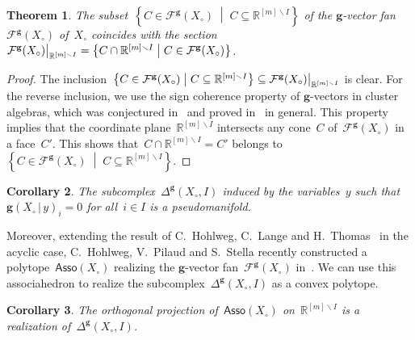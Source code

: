 \documentclass{amsart}
\newtheorem{theorem}{Theorem}%
\newtheorem{corollary}[theorem]{Corollary}
\theoremstyle{definition}
\newcommand{\R}{\mathbb{R}} %
\renewcommand{\b}[1]{\mathbf{#1}} %
\newcommand{\set}[2]{\left\{ #1 \;\middle|\; #2 \right\}} %
\newcommand{\ssm}{\smallsetminus} %
\newcommand{\Asso}{\mathsf{Asso}} %
\newcommand{\gvector}[2]{\mathbf{g}(#1 \,|\, #2)} %
\newcommand{\gvectorFan}{\mathcal{F}^\mathbf{g}} %
\newcommand{\restrictedComplex}[3]{\Delta^{\b{#1}}(#2,#3)} %
\renewcommand{\restriction}[2]{\left.\kern-\nulldelimiterspace #1 \vphantom{\big|} \right|_{#2}}
\begin{document}
\begin{theorem}
The subset~$\set{C \in \gvectorFan(X_\circ)}{C \subseteq \R^{[m] \ssm I}}$ of the $\b{g}$-vector fan~$\gvectorFan(X_\circ)$ of~$X_\circ$ coincides with the section~$\restriction{\gvectorFan(X_\circ)}{\R^{[m] \ssm I}} = \set{C \cap \R^{[m] \ssm I}}{C \in \gvectorFan(X_\circ)}$.
\end{theorem}

\begin{proof}
The inclusion~$\set{C \in \gvectorFan(X_\circ)}{C \subseteq \R^{[m] \ssm I}} \subseteq \restriction{\gvectorFan(X_\circ)}{\R^{[m] \ssm I}}$ is clear. For the reverse inclusion, we use the sign coherence property of $\b{g}$-vectors in cluster algebras, which was conjectured in~\cite[Conjecture 6.13]{FominZelevinsky-ClusterAlgebrasIV} and proved in~\cite[Theorem 5.1]{GrossHackingKeelKontsevich} in general. This property implies that the coordinate plane~$\R^{[m] \ssm I}$ intersects any cone~$C$ of~$\gvectorFan(X_\circ)$ in a face~$C'$. This shows that~$C \cap \R^{[m] \ssm I} = C'$ belongs to~$\set{C \in \gvectorFan(X_\circ)}{C \subseteq \R^{[m] \ssm I}}$.
\end{proof}

\begin{corollary}
The subcomplex~$\restrictedComplex{g}{X_\circ}{I}$ induced by the variables~$y$ such that~$\gvector{X_\circ}{y}_i = 0$ for all~$i \in I$ is a pseudomanifold.
\end{corollary}

Moreover, extending the result of C.~Hohlweg, C.~Lange and H.~Thomas~\cite{HohlwegLangeThomas} in the acyclic case, C.~Hohlweg, V.~Pilaud and S.~Stella recently constructed a polytope~$\Asso(X_\circ)$ realizing the $\b{g}$-vector fan~$\gvectorFan(X_\circ)$ in~\cite{HohlwegPilaudStella}. We can use this associahedron to realize  the subcomplex~$\restrictedComplex{g}{X_\circ}{I}$ as a convex polytope.

\begin{corollary}
The orthogonal projection of~$\Asso(X_\circ)$ on~$\R^{[m] \ssm I}$ is a realization of~$\restrictedComplex{g}{X_\circ}{I}$.
\end{corollary}

%
\end{document}
